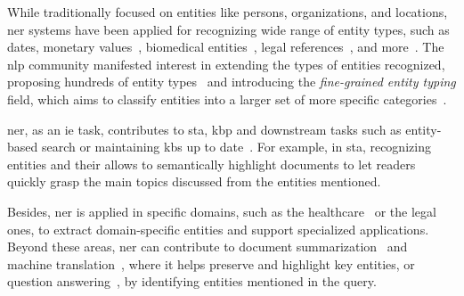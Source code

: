 While traditionally focused on entities like persons, organizations, and locations, \ac{ner} systems have been applied for recognizing wide range of entity types, such as dates, monetary values~\cite{muc6_overview_1995}, biomedical entities~\cite{hanisch2005prominer,archana2023effective,aioner_bioner_2023}, legal references~\cite{chalkidis_extracting_contracts_2017,cardellino_etal_2017_lowcost,ccetindaug2023name_legal_turkish}, and more~\cite{entityorientedsearch2018balog}. The \ac{nlp} community manifested interest in extending the types of entities recognized, proposing hundreds of entity types~\cite{sekine2002extended_150ner_types,sekine2004definition_200ner_types,yosef-etal-2012-hyena} and introducing the \emph{fine-grained entity typing} field, which aims to classify entities into a larger set of more specific categories~\cite{fget_review_2023}.

\ac{ner}, as an \acl{ie} task, contributes to \acl{sta}, \acl{kbp} and downstream tasks such as entity-based search or maintaining \acp{kb} up to date~\cite{entityorientedsearch2018balog}. For example, in \ac{sta}, recognizing entities and their allows to semantically highlight documents to let readers quickly grasp the main topics discussed from the entities mentioned. 

Besides, \ac{ner} is applied in specific domains, such as the healthcare~\cite{hanisch2005prominer,archana2023effective,aioner_bioner_2023} or the legal~\cite{chalkidis_extracting_contracts_2017,cardellino_etal_2017_lowcost,ccetindaug2023name_legal_turkish} ones, to extract domain-specific entities and support specialized applications.
Beyond these areas, \ac{ner} can contribute to document summarization~\cite{khademi2020persian,lin-zeldes-2024-gumsley,roha_ner_summarizaton_2023} and machine translation~\cite{xie2022end,hkiri-etal-2017-arabic}, where it helps preserve and highlight key entities, or question answering~\cite{molla2006named,ner_qa_review_2016}, by identifying entities mentioned in the query.

